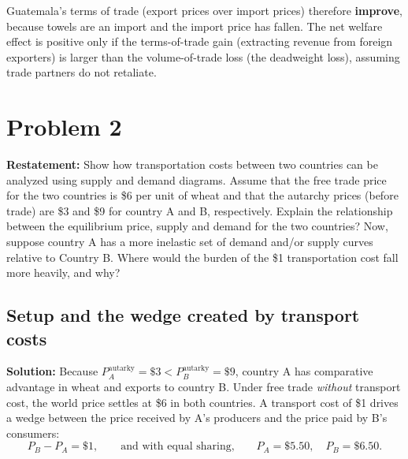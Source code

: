 \documentclass[11pt, letterpaper]{article}
\begin{document}
Guatemala's terms of trade (export prices over import prices) therefore \textbf{improve}, because towels are an import and the import price has fallen. The net welfare effect is positive only if the terms-of-trade gain (extracting revenue from foreign exporters) is larger than the volume-of-trade loss (the deadweight loss), assuming trade partners do not retaliate.

\vspace{1em}
\section*{Problem 2}

\textbf{Restatement:} Show how transportation costs between two countries can be analyzed using supply and demand diagrams. Assume that the free trade price for the two countries is \$6 per unit of wheat and that the autarchy prices (before trade) are \$3 and \$9 for country A and B, respectively. Explain the relationship between the equilibrium price, supply and demand for the two countries? Now, suppose country A has a more inelastic set of demand and/or supply curves relative to Country B. Where would the burden of the \$1 transportation cost fall more heavily, and why?

\subsection*{Setup and the wedge created by transport costs}
\noindent \textbf{Solution:} Because $P_A^{\text{autarky}} = \$3 < P_B^{\text{autarky}} = \$9$, country A has comparative advantage in wheat and exports to country B. Under free trade \textit{without} transport cost, the world price settles at \$6 in both countries. A transport cost of \$1 drives a wedge between the price received by A's producers and the price paid by B's consumers:
\[
  P_B - P_A = \$1, \qquad \text{and with equal sharing,}\qquad P_A = \$5.50,\quad P_B = \$6.50.
\]
\end{document}
